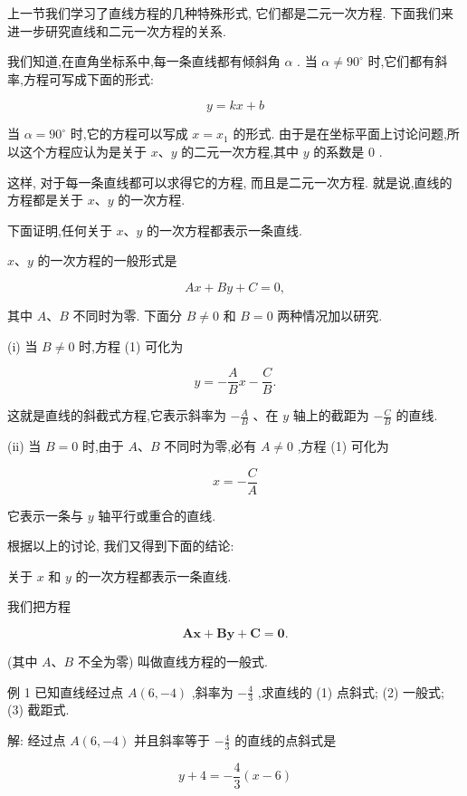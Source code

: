\documentclass[lang=cn,newtx,12pt,scheme=chinese]{elegantbook}
\begin{document}
上一节我们学习了直线方程的几种特殊形式, 它们都是二元一次方程. 下面我们来进一步研究直线和二元一次方程的关系.

我们知道,在直角坐标系中,每一条直线都有倾斜角 \(\alpha\) . 当 \(\alpha \neq {90}^{ \circ }\) 时,它们都有斜率,方程可写成下面的形式:

\[
  y = {kx} + b
\]

当 \(\alpha = {90}^{ \circ }\) 时,它的方程可以写成 \(x = {x}_{1}\) 的形式. 由于是在坐标平面上讨论问题,所以这个方程应认为是关于 \(x\text{、}y\) 的二元一次方程,其中 \(y\) 的系数是 0 .

这样, 对于每一条直线都可以求得它的方程, 而且是二元一次方程. 就是说,直线的方程都是关于 \(x\text{、}y\) 的一次方程.
\begin{corollary}[直线方程的一般形式]
下面证明,任何关于 \(x\text{、}y\) 的一次方程都表示一条直线.

\(x\text{、}y\) 的一次方程的一般形式是

\[
    {Ax} + {By} + C = 0, \tag{1}
\]
\end{corollary}
其中 \(A\text{、}B\) 不同时为零. 下面分 \(B \neq 0\) 和 \(B = 0\) 两种情况加以研究.

(i) 当 \(B \neq 0\) 时,方程 (1) 可化为

\[
  y = - \frac{A}{B}x - \frac{C}{B}.
\]

这就是直线的斜截式方程,它表示斜率为 \(- \frac{A}{B}\) 、在 \(y\) 轴上的截距为 \(- \frac{C}{B}\) 的直线.

(ii) 当 \(B = 0\) 时,由于 \(A\text{、}B\) 不同时为零,必有 \(A \neq 0\) ,方程 (1) 可化为

\[
  x = - \frac{C}{A}
\]

它表示一条与 \(y\) 轴平行或重合的直线.

根据以上的讨论, 我们又得到下面的结论:

关于 \(x\) 和 \(y\) 的一次方程都表示一条直线.

我们把方程

\[
  \mathbf{A}\mathbf{x} + \mathbf{B}\mathbf{y} + \mathbf{C} = \mathbf{0}. \tag{1}
\]

(其中 \(A\text{、}B\) 不全为零) 叫做直线方程的一般式.

例 1 已知直线经过点 \(A\left( {6, - 4}\right)\) ,斜率为 \(- \frac{4}{3}\) ,求直线的 (1) 点斜式; (2) 一般式; (3) 截距式.

解: 经过点 \(A\left( {6, - 4}\right)\) 并且斜率等于 \(- \frac{4}{3}\) 的直线的点斜式是

\[
  y + 4 = - \frac{4}{3}\left( {x - 6}\right)
\]
\end{document}
